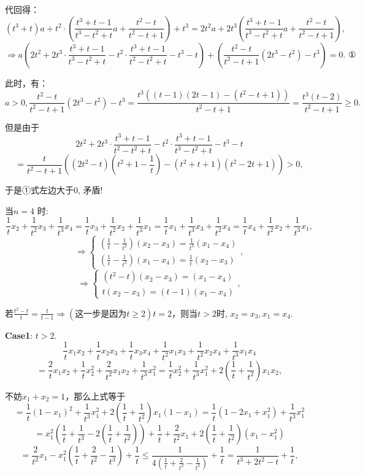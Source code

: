 \documentclass[lang=cn,12pt,thmcnt=section]{elegantbook}
\begin{document}
\begin{solution}
代回得：
\[
(t^{3}+t)a+t^{2}\cdot(\frac{t^{3}+t - 1}{t^{3}-t^{2}+t}a+\frac{t^{2}-t}{t^{2}-t + 1})+t^{3}=2t^{2}a+2t^{3}(\frac{t^{3}+t - 1}{t^{3}-t^{2}+t}a+\frac{t^{2}-t}{t^{2}-t + 1}),
\]
\[
\Rightarrow a(2t^{2}+2t^{3}\cdot\frac{t^{3}+t - 1}{t^{3}-t^{2}+t}-t^{2}\cdot\frac{t^{3}+t - 1}{t^{2}-t^{2}+t}-t^{3}-t)+(\frac{t^{2}-t}{t^{2}-t + 1}(2t^{3}-t^{2})-t^{3}) = 0.\text{ ①}
\]

此时，有：
\[
a>0,\frac{t^{2}-t}{t^{2}-t + 1}(2t^{3}-t^{2})-t^{3}=\frac{t^{3}((t - 1)(2t - 1)-(t^{2}-t + 1))}{t^{2}-t + 1}=\frac{t^{3}(t - 2)}{t^{2}-t + 1}\geq0.
\]

但是由于
\[
2t^{2}+2t^{3}\cdot\frac{t^{3}+t - 1}{t^{2}-t^{2}+t}-t^{2}\cdot\frac{t^{3}+t - 1}{t^{3}-t^{2}+t}-t^{3}-t
\]
\[
=\frac{t}{t^{2}-t + 1}((2t^{2}-t)(t^{2}+1-\frac{1}{t})-(t^{2}+t + 1)(t^{2}-2t + 1))>0,
\]

于是①式左边大于$0$, 矛盾!

当$ n = 4 $ 时:
\[
\frac{1}{t}x_2+\frac{1}{t^2}x_3+\frac{1}{t^3}x_4=\frac{1}{t}x_3+\frac{1}{t^2}x_2+\frac{1}{t^3}x_1=\frac{1}{t}x_1+\frac{1}{t^3}x_3+\frac{1}{t^2}x_4=\frac{1}{t}x_4+\frac{1}{t^2}x_2+\frac{1}{t^3}x_1,
\]
\[
\Rightarrow
\begin{cases}
(\frac{1}{t}-\frac{1}{t^2})(x_2 - x_3)=\frac{1}{t^3}(x_1 - x_4) \\
(\frac{1}{t}-\frac{1}{t^3})(x_1 - x_4)=\frac{1}{t}(x_2 - x_3)
\end{cases},
\]
\[
\Rightarrow
\begin{cases}
(t^2 - t)(x_2 - x_3)=(x_1 - x_4) \\
t(x_2 - x_3)=(t - 1)(x_1 - x_4)
\end{cases},
\]

若$\frac{t^2 - t}{t}=\frac{t}{t - 1} \Rightarrow (\text{这一步是因为} t \geq 2) t = 2$，则当$t > 2$时, $x_2 = x_3, x_1 = x_4$.

\textbf{Case1}: $t > 2.$
\[
\frac{1}{t}x_1x_2+\frac{1}{t}x_2x_3+\frac{1}{t}x_3x_4+\frac{1}{t^2}x_1x_3+\frac{1}{t^2}x_2x_4+\frac{1}{t^3}x_1x_4
\]
\[
= \frac{2}{t}x_1x_2+\frac{1}{t}x_2^2+\frac{2}{t^2}x_1x_2+\frac{1}{t^3}x_1^2=\frac{1}{t}x_2^2+\frac{1}{t^3}x_1^2+2(\frac{1}{t}+\frac{1}{t^2})x_1x_2,
\]

不妨$x_1 + x_2 = 1$，那么上式等于
\[
= \frac{1}{t}(1 - x_1)^2+\frac{1}{t^3}x_1^2+2(\frac{1}{t}+\frac{1}{t^2})x_1(1 - x_1)=\frac{1}{t}(1 - 2x_1+x_1^2)+\frac{1}{t^3}x_1^2
\]
\[
= x_1^2(\frac{1}{t}+\frac{1}{t^3}-2(\frac{1}{t}+\frac{1}{t^2}))+\frac{1}{t}+\frac{2}{t^2}x_1
+2(\frac{1}{t}+\frac{1}{t^2})(x_1 - x_1^2)
\]
\[
= \frac{2}{t^2}x_1 - x_1^2(\frac{1}{t}+\frac{2}{t^2}-\frac{1}{t^3})+\frac{1}{t} \leq \frac{1}{4(\frac{1}{t}+\frac{2}{t^2}-\frac{1}{t^3})}+\frac{1}{t}=\frac{1}{t^3 + 2t^2 - t}+\frac{1}{t},
\]


\end{solution}
\end{document}

